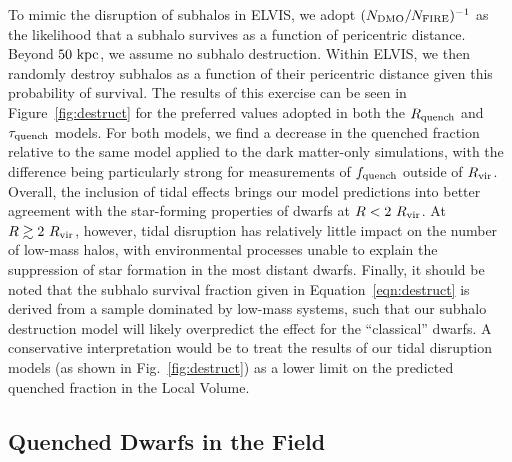 To mimic the disruption of subhalos in ELVIS, we adopt $(N_{\rm DMO}/N_{\rm
  FIRE})^{-1}$ as the likelihood that a subhalo survives as a function of
pericentric distance.
%
Beyond $50~{\rm kpc}$, we assume no subhalo destruction.
%
Within ELVIS, we then randomly destroy subhalos as a function of their
pericentric distance given this probability of survival.
%
The results of this exercise can be seen in Figure~\ref{fig:destruct} for the
preferred values adopted in both the $R_{\rm quench}$ and $\tau_{\rm quench}$
models. For both models, we find a decrease in the quenched fraction relative to
the same model applied to the dark matter-only simulations, with the difference
being particularly strong for measurements of $f_{\rm quench}$ outside of
$R_{\rm{vir}}$.
%
Overall, the inclusion of tidal effects brings our model predictions into better
agreement with the star-forming properties of dwarfs at $R < 2~R_{\rm{vir}}$. 
%
At $R \gtrsim 2~R_{\rm{vir}}$, however, tidal disruption has relatively little impact on the
number of low-mass halos, with environmental processes unable to explain the
suppression of star formation in the most distant dwarfs. 
%
Finally, it should be noted that the subhalo survival fraction given in
Equation~\ref{eqn:destruct} is derived from a sample dominated by low-mass
systems, such that our subhalo destruction model will likely overpredict the
effect for the ``classical'' dwarfs. A conservative interpretation would be to
treat the results of our tidal disruption models (as shown in
Fig.~\ref{fig:destruct}) as a lower limit on the predicted quenched fraction in
the Local Volume.







\subsection{Quenched Dwarfs in the Field}
\label{subsec:weirdos}


